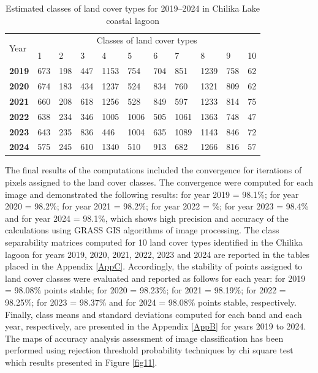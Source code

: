 \documentclass[jmse,article,submit,pdftex,moreauthors]{Definitions/mdpi}
\begin{document}
\begin{table}[H]
  \centering
  \begin{tabularx}{\textwidth}{p{0.9cm}p{0.9cm}p{0.9cm}p{0.9cm}p{0.9cm}p{0.9cm}p{0.9cm}p{0.9cm}p{0.9cm}p{0.9cm}p{0.9cm}}
  \toprule
  \multirow{2}{*}{Year} & \multicolumn{10}{c}{Classes of land cover types} \\
     & 1 & 2 & 3 & 4 & 5 & 6 & 7 & 8 & 9 & 10 \\
    \midrule
    \textbf{2019} & 673 & 198 & 447 & 1153 & 754 & 704 & 851 & 1239 & 758 & 62 \\
    \textbf{2020} & 674 & 183 & 434 & 1237 & 524 & 834 & 760 & 1321 & 809 & 62 \\
    \textbf{2021} & 660 & 208 & 618 & 1256 & 528 & 849 & 597 & 1233 & 814 & 75 \\
    \textbf{2022} & 638 & 234 & 346 & 1005 & 1006 & 505 & 1061 & 1363 & 748 & 47 \\
     \textbf{2023} & 643 & 235 & 836 & 446 & 1004 & 635 & 1089 & 1143 & 846 & 72 \\
    \textbf{2024}  & 575 & 245 & 610 & 1340 & 510 & 913 & 682 & 1266 & 816 & 57 \\
\bottomrule
\end{tabularx}
  \caption{Estimated classes of land cover types for 2019--2024 in Chilika Lake coastal lagoon}
  \label{tab01}
\end{table}

The final results of the computations included the convergence for iterations of pixels assigned to the land cover classes. The convergence were computed for each image and demonstrated the following results: for year 2019 = 98.1\%; for year 2020 = 98.2\%; for year 2021 = 98.2\%; for year 2022 = \%; for year 2023 = 98.4\% and for year 2024 = 98.1\%, which shows high precision and accuracy of the calculations using GRASS GIS algorithms of image processing. The class separability matrices computed for 10 land cover types identified in the Chilika lagoon for years 2019, 2020, 2021, 2022, 2023 and 2024 are reported in the tables placed in the Appendix \ref{AppC}.  Accordingly, the stability of points assigned to land cover classes were evaluated and reported as follows for each year: for 2019 = 98.08\% points stable; for 2020 = 98.23\%; for 2021 = 98.19\%; for 2022 = 98.25\%; for 2023 = 98.37\% and for 2024 = 98.08\% points stable, respectively. Finally, class means and standard deviations computed for each band and each year, respectively, are presented in the Appendix \ref{AppB} for years 2019 to 2024. The maps of accuracy analysis assessment  of image classification has been performed using rejection threshold probability techniques by chi square test which results presented in Figure \ref{fig11}. 
\end{document}
